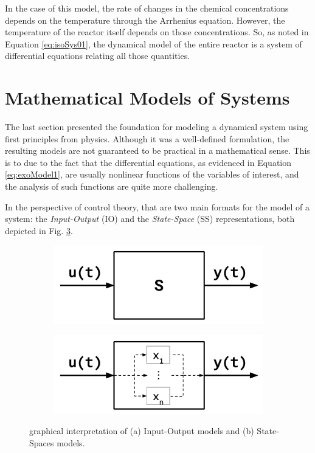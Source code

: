 \documentclass[a4paper,11pt]{book}
\numberwithin{figure}{chapter}
\numberwithin{equation}{chapter}
\numberwithin{table}{chapter}
\theoremstyle{definition}
\begin{document}
In the case of this model, the rate of changes in the chemical concentrations depends on the temperature through the Arrhenius equation. However, the temperature of the reactor itself depends on those concentrations. So, as noted in Equation \eqref{eq:isoSys01}, the dynamical model of the entire reactor is a system of differential equations relating all those quantities.


\section{Mathematical Models of Systems}

The last section presented the foundation for modeling a dynamical system using first principles from physics. Although it was a well-defined formulation, the resulting models are not guaranteed to be practical in a mathematical sense. This is to due to the fact that the differential equations, as evidenced in Equation \eqref{eq:exoModel1}, are usually nonlinear functions of the variables of interest, and the analysis of such functions are quite more challenging. 

In the perspective of control theory, that are two main formats for the model of a system: the \textit{Input-Output} (IO) and the \textit{State-Space} (SS) representations, both depicted in Fig. \ref{fig:model1}. 

\begin{figure}[ht] 
	\centering
	\begin{subfigure}{0.49\textwidth}
		\centering	
		\includegraphics[scale=0.7]{chapter2/model01}
		\caption{}	\label{fig:model01a}
	\end{subfigure}
	\begin{subfigure}{0.49\textwidth}	
	\centering
		\includegraphics[scale=0.7]{chapter2/model02}
		\caption{} \label{fig:model01b}
	\end{subfigure}
	
	\caption{graphical interpretation of (a) Input-Output models and (b) State-Spaces models.} 
	\label{fig:model1}
\end{figure}
\end{document}
